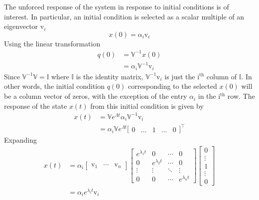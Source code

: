 The unforced response of the system in response to initial conditions is of interest.
In particular, an initial condition is selected as a scalar multiple of an eigenvector $\mathrm{v}_{i}$
\begin{equation*}
  x(0)=\alpha_{i}\mathrm{v}_{i}
\end{equation*}
Using the linear transformation
\begin{equation*}
  \begin{split}
    q(0)
    &= \mathbb{V}^{-1}x(0) \\
    &= \alpha_{i}\mathbb{V}^{-1}\mathrm{v}_{i}
  \end{split}
\end{equation*}
Since $\mathbb{V}^{-1}\mathbb{V}=\mathbb{I}$ where $\mathbb{I}$ is the identity matrix, $\mathbb{V}^{-1}\mathrm{v}_{i}$ is just the $\mathrm{i^{th}}$ column of $\mathbb{I}$.
In other words, the initial condition $q(0)$ corresponding to the selected $x(0)$ will be a column vector of zeros, with the exception of the entry $\alpha_{i}$ in the $\mathrm{i^{th}}$ row.
The response of the state $x(t)$ from this initial condition is given by
\begin{equation*}
  \begin{split}
    x(t)&=\mathbb{V}e^{\Lambda{t}}\alpha_{i}\mathbb{V}^{-1}\mathrm{v}_{i} \\
    &=\alpha_{i}\mathbb{V}e^{\Lambda{t}}
    \bigr[
    \begin{array}{ccccc}
      0 & \hdots & 1 & \hdots & 0
    \end{array}\bigr]^{\top}
  \end{split}
\end{equation*}
Expanding
\begin{equation*}
  \begin{split}
    x(t)&=\alpha_{i}
    \left[
    \begin{array}{ccc}
      \mathrm{v}_{1} & \cdots & \mathrm{v}_{n}
    \end{array} \right]
    \left[
    \begin{array}{cccc}
      e^{\lambda_{1}t} & 0 & \cdots & 0 \\
      0 & e^{\lambda_{2}t} & \cdots & 0 \\
      \vdots & \vdots & \ddots & \vdots \\
      0 & 0 & \cdots & e^{\lambda_{n}t}
    \end{array}\right]
    \begin{bmatrix}
      0 \\
      \vdots \\
      1 \\
      \vdots \\
      0
    \end{bmatrix} \\
    &=\alpha_{i}e^{\lambda_{i}t}\mathrm{v}_{i}
  \end{split}
\end{equation*}
